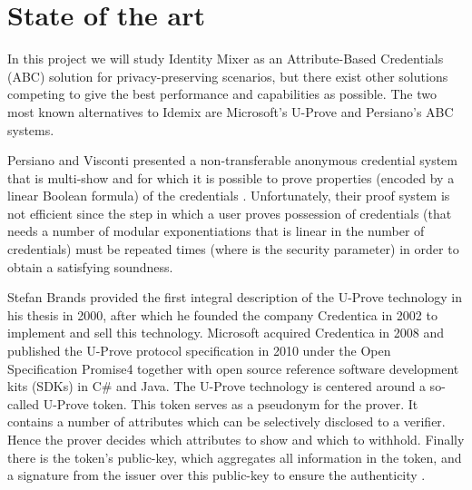 \chapter{State of the art}\label{ch:stateoftheart}

In this project we will study Identity Mixer as an Attribute-Based Credentials (ABC) solution for privacy-preserving scenarios, but there exist other solutions competing to give the best performance and capabilities as possible. The two most known alternatives to Idemix are Microsoft's U-Prove and Persiano's ABC systems.










Persiano and Visconti presented a non-transferable anonymous
credential system that is multi-show and for which it is possible to prove
properties (encoded by a linear Boolean formula) of the credentials \citep{book:185217}. Unfortunately, their proof system is not efficient since the step in which a user proves
possession of credentials (that needs a number of modular exponentiations that
is linear in the number of credentials) must be repeated times (where is the
security parameter) in order to obtain a satisfying soundness.







Stefan Brands provided the first integral description of the U-Prove
technology in his thesis \citep{uprove} in 2000, after which he founded the company Credentica
in 2002 to implement and sell this technology. Microsoft acquired Credentica
in 2008 and published the U-Prove protocol specification \citep{uprove2} in 2010
under the Open Specification Promise4 together with open source reference software
development kits (SDKs) in C\# and Java.
The U-Prove technology is centered around a so-called U-Prove token. This
token serves as a pseudonym for the prover. It contains a number of attributes
which can be selectively disclosed to a verifier. Hence the prover decides which
attributes to show and which to withhold. Finally there is the token’s public-key, which aggregates all information in the token, and a signature from the issuer
over this public-key to ensure the authenticity \citep{book:947508}.

